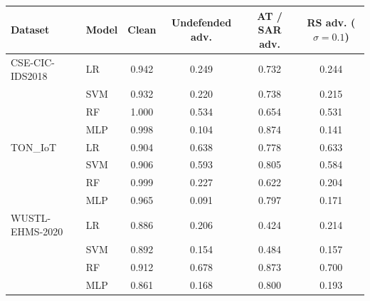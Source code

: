 \begin{tabular}{l l c c c c}
\toprule
\textbf{Dataset} & \textbf{Model} & \textbf{Clean} & \textbf{Undefended adv.} & \textbf{AT / SAR adv.} & \textbf{RS adv. ($\sigma{=}0.1$)} \\
\midrule
CSE-CIC-IDS2018 & LR & 0.942 & 0.249 & 0.732 & 0.244 \\
 & SVM & 0.932 & 0.220 & 0.738 & 0.215 \\
 & RF & 1.000 & 0.534 & 0.654 & 0.531 \\
 & MLP & 0.998 & 0.104 & 0.874 & 0.141 \\
TON\_IoT & LR & 0.904 & 0.638 & 0.778 & 0.633 \\
 & SVM & 0.906 & 0.593 & 0.805 & 0.584 \\
 & RF & 0.999 & 0.227 & 0.622 & 0.204 \\
 & MLP & 0.965 & 0.091 & 0.797 & 0.171 \\
WUSTL-EHMS-2020 & LR & 0.886 & 0.206 & 0.424 & 0.214 \\
 & SVM & 0.892 & 0.154 & 0.484 & 0.157 \\
 & RF & 0.912 & 0.678 & 0.873 & 0.700 \\
 & MLP & 0.861 & 0.168 & 0.800 & 0.193 \\
\bottomrule
\end{tabular}
